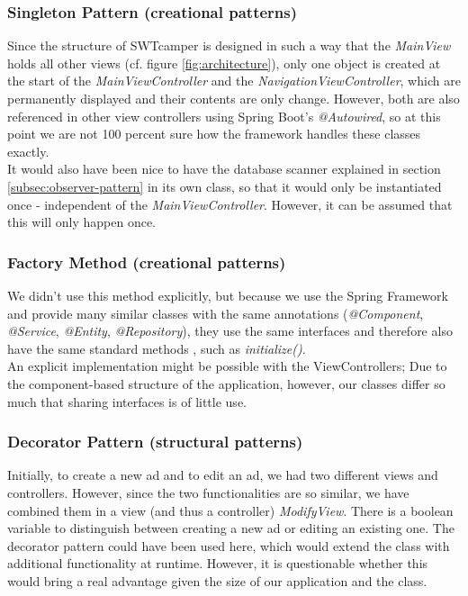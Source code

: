 \subsubsection{Singleton Pattern (creational patterns)}
Since the structure of SWTcamper is designed in such a way that the \textit{MainView} holds all other views (cf. figure \ref{fig:architecture}), only one object is created at the start of the \textit{MainViewController} and the \textit{NavigationViewController}, which are permanently displayed and their contents are only change. However, both are also referenced in other view controllers using Spring Boot's \textit{@Autowired}, so at this point we are not 100 percent sure how the framework handles these classes exactly. \\
It would also have been nice to have the database scanner explained in section \ref{subsec:observer-pattern} in its own class, so that it would only be instantiated once - independent of the \textit{MainViewController}. However, it can be assumed that this will only happen once.

\subsubsection{Factory Method (creational patterns)}
We didn't use this method explicitly, but because we use the Spring Framework and provide many similar classes with the same annotations (\textit{@Component}, \textit{@Service}, \textit{@Entity}, \textit{@Repository}), they use the same interfaces and therefore also have the same standard methods , such as \textit{initialize()}. \\
An explicit implementation might be possible with the ViewControllers; Due to the component-based structure of the application, however, our classes differ so much that sharing interfaces is of little use.

\subsubsection{Decorator Pattern (structural patterns)}
Initially, to create a new ad and to edit an ad, we had two different views and controllers. However, since the two functionalities are so similar, we have combined them in a view (and thus a controller) \textit{ModifyView}. There is a boolean variable to distinguish between creating a new ad or editing an existing one. The decorator pattern could have been used here, which would extend the class with additional functionality at runtime. However, it is questionable whether this would bring a real advantage given the size of our application and the class.

